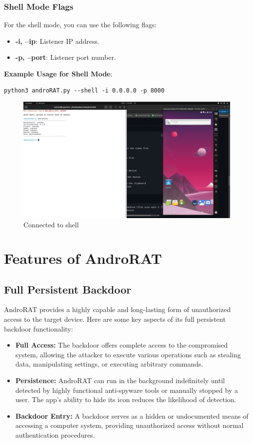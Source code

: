 \documentclass[12pt]{article}
\begin{document}
\subsubsection{Shell Mode Flags}
For the shell mode, you can use the following flags:

\begin{itemize}
    \item \textbf{-i, --ip}: Listener IP address.
    \item \textbf{-p, --port}: Listener port number.
\end{itemize}

\textbf{Example Usage for Shell Mode}:
\begin{lstlisting}[style=shell]
python3 androRAT.py --shell -i 0.0.0.0 -p 8000
\end{lstlisting}
\begin{figure}[h!]
  \centering
  \includegraphics[width=0.6\linewidth]{ConnectedShell.png}
  \caption{Connected to shell}
\end{figure}

\section{Features of AndroRAT}

\subsection{Full Persistent Backdoor}
AndroRAT provides a highly capable and long-lasting form of unauthorized access to the target device. Here are some key aspects of its full persistent backdoor functionality:
\begin{itemize}
    \item \textbf{Full Access:} The backdoor offers complete access to the compromised system, allowing the attacker to execute various operations such as stealing data, manipulating settings, or executing arbitrary commands.
    \item \textbf{Persistence:} AndroRAT can run in the background indefinitely until detected by highly functional anti-spyware tools or manually stopped by a user. The app's ability to hide its icon reduces the likelihood of detection.
    \item \textbf{Backdoor Entry:} A backdoor serves as a hidden or undocumented means of accessing a computer system, providing unauthorized access without normal authentication procedures.
\end{itemize}
\end{document}
